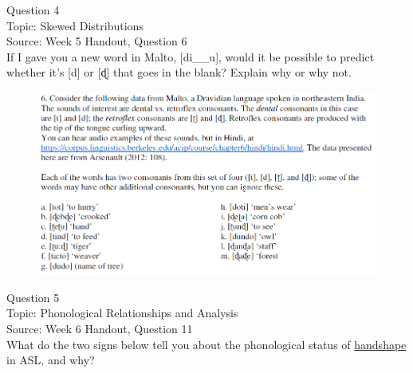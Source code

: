 \documentclass[12pt]{article}
\begin{document}
\newpage

{\large Question 4}\\

Topic: Skewed Distributions\\
Source: Week 5 Handout, Question 6\\

If I gave you a new word in Malto, [di\_\_u], would it be possible to predict whether it's [d] or [ɖ] that goes in the blank? Explain why or why not.\\

\begin{figure}[H]
\includegraphics{../images/malto.png}
\end{figure}

\newpage

{\large Question 5}\\

Topic: Phonological Relationships and Analysis\\
Source: Week 6 Handout, Question 11\\

What do the two signs below tell you about the phonological status of \underline{handshape} in ASL, and why?\\
\end{document}
